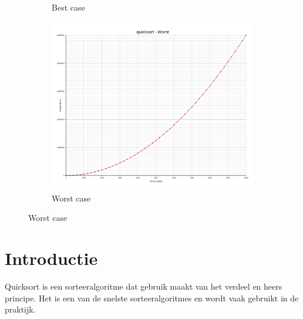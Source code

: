 \documentclass[a4paper]{article}
\begin{document}
\begin{figure}[h]
\begin{subfigure}[b]{0.3\textwidth}
    \caption{Best case}
    \label{fig:merge-best}
  \end{subfigure}
  \begin{subfigure}[b]{0.3\textwidth}
    \includegraphics[width=\textwidth]{../plots/quicksort-worst.png}
    \caption{Worst case}
    \label{fig:merge-worst}
  \end{subfigure}
\end{figure}

\section{Introductie}
Quicksort is een sorteeralgoritme dat gebruik maakt van het verdeel en heers principe.
Het is een van de snelste sorteeralgoritmes en wordt vaak gebruikt in de praktijk.
\end{document}
